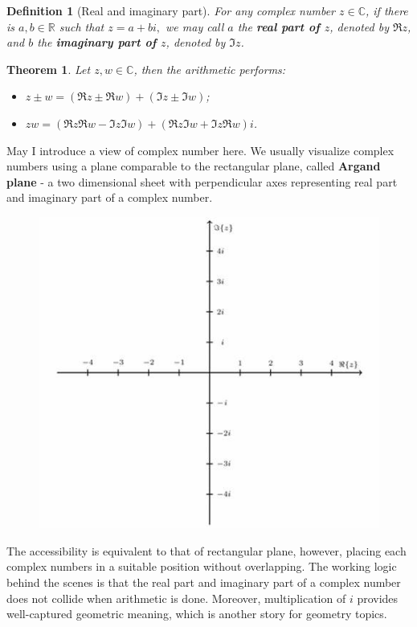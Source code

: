 \documentclass[12pt]{article}
\newtheorem{definition}{Definition}[section]
\newtheorem*{theorem}{Theorem}
\begin{document}
    \begin{definition}[Real and imaginary part]
        For any complex number $z\in\mathbb{C}$, if there is $a,b\in\mathbb{R}$ such that $z=a+bi,$ we may call $a$ the \textbf{real part of $z$}, denoted by $\Re{z}$, and $b$ the \textbf{imaginary part of $z$}, denoted by $\Im{z}$.
    \end{definition}

    \begin{theorem}
        Let $z,w\in\mathbb{C}$, then the arithmetic performs:\begin{itemize}
            \item $z\pm w=(\Re{z}\pm \Re{w})+(\Im{z}\pm \Im{w})$;
            \item $zw = (\Re{z}\Re{w}-\Im{z}\Im{w})+(\Re{z}\Im{w}+\Im{z}\Re{w})i$.
        \end{itemize}
    \end{theorem}

    May I introduce a view of complex number here. We usually visualize complex numbers using a plane comparable to the rectangular plane, called \textbf{Argand plane} - a two dimensional sheet with perpendicular axes representing real part and imaginary part of a complex number.

    \begin{figure}[H]
        \centering
        \includegraphics[scale=0.8]{argand.jpg}
    \end{figure}

    The accessibility is equivalent to that of rectangular plane, however, placing each complex numbers in a suitable position without overlapping. The working logic behind the scenes is that the real part and imaginary part of a complex number does not collide when arithmetic is done. Moreover, multiplication of $i$ provides well-captured geometric meaning, which is another story for geometry topics.
\end{document}
